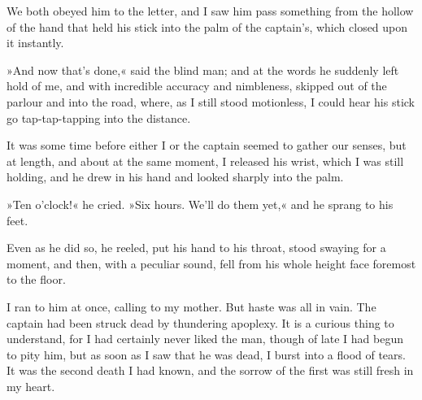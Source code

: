 We both obeyed him to the letter, and I saw him pass something from the hollow of the hand that held his stick into the palm of the captain's, which closed upon it instantly.

»And now that's done,« said the blind man; and at the words he suddenly left hold of me, and with incredible accuracy and nimbleness, skipped out of the parlour and into the road, where, as I still stood motionless, I could hear his stick go tap-tap-tapping into the distance.

It was some time before either I or the captain seemed to gather our senses, but at length, and about at the same moment, I released his wrist, which I was still holding, and he drew in his hand and looked sharply into the palm.

»Ten o'clock!« he cried. »Six hours. We'll do them yet,« and he sprang to his feet.

Even as he did so, he reeled, put his hand to his throat, stood swaying for a moment, and then, with a peculiar sound, fell from his whole height face foremost to the floor.

I ran to him at once, calling to my mother. But haste was all in vain. The captain had been struck dead by thundering apoplexy. It is a curious thing to understand, for I had certainly never liked the man, though of late I had begun to pity him, but as soon as I saw that he was dead, I burst into a flood of tears. It was the second death I had known, and the sorrow of the first was still fresh in my heart.